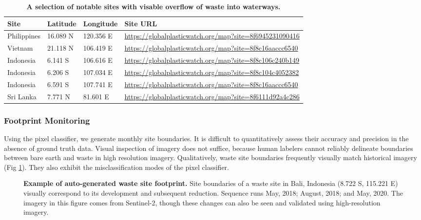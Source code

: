 \documentclass[10pt,letterpaper]{article}
\begin{document}
\begin{table}[!ht]
\begin{adjustwidth}{-2.25in}{0in}
\caption{\textbf{A selection of notable sites with visable overflow of waste into waterways.}}
\label{table:waterside}
\begin{tabular}{@{}llll@{}}
\toprule
\textbf{Site} & \textbf{Latitude} & \textbf{Longitude} & \textbf{Site URL}                                       \\ \midrule
Philippines   & 16.089 N          & 120.356 E          & \url{https://globalplasticwatch.org/map?site=8f6945231090416} \\
Vietnam       & 21.118 N          & 106.419 E          & \url{https://globalplasticwatch.org/map?site=8f8c16aaccc6540} \\
Indonesia     & 6.141 S           & 106.616 E          & \url{https://globalplasticwatch.org/map?site=8f8c106c240b149} \\
Indonesia     & 6.206 S           & 107.034 E          & \url{https://globalplasticwatch.org/map?site=8f8c104c4052382} \\
Indonesia     & 6.591 S           & 107.741 E          & \url{https://globalplasticwatch.org/map?site=8f8c16aaccc6540} \\
Sri Lanka     & 7.771 N           & 81.601 E           & \url{https://globalplasticwatch.org/map?site=8f6111d92a4c286}     \\ \bottomrule
\end{tabular}
\end{adjustwidth}
\end{table}

\subsubsection*{Footprint Monitoring}
Using the pixel classifier, we generate monthly site boundaries. It is difficult to quantitatively assess their accuracy and precision in the absence of ground truth data. Visual inspection of imagery does not suffice, because human labelers cannot reliably delineate boundaries between bare earth and waste in high resolution imagery. Qualitatively, waste site boundaries frequently visually match historical imagery (Fig \ref{fig:contours}). They also exhibit the misclassification modes of the pixel classifier.

\begin{figure}[!h]
    \caption{{\bf Example of auto-generated waste site footprint.}
    Site boundaries of a waste site in Bali, Indonesia (8.722 S, 115.221 E) visually correspond to its development and subsequent reduction. Sequence runs May, 2018; August, 2018; and May, 2020. The imagery in this figure comes from Sentinel-2, though these changes can also be seen and validated using high-resolution imagery.}
    \label{fig:contours}
\end{figure}
\end{document}
